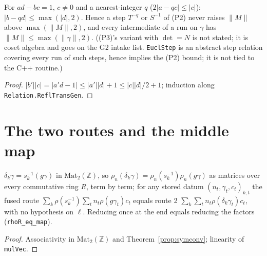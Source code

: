 \begin{lemma}\label{lem:bounds-4}
  \leanok
  For $ad-bc=1$, $c\ne0$ and a nearest-integer $q$ ($2|a-qc|\le|c|$): $|b-qd|\le\max(|d|,2)$. Hence a step $T^{-q}$ or
  $S^{-1}$ of (P2) never raises $\|M\|$ above $\max(\|M\|,2)$, and every intermediate of a run on $\gamma$ has
  $\|M\|\le\max(\|\gamma\|,2)$. ((P3)'s variant with $\det=N$ is not stated; it is coset algebra and goes on the G2 intake list. \texttt{EuclStep} is an abstract step relation covering every run of such steps, hence implies the (P2) bound; it is not tied to the C++ routine.)
\end{lemma}
\begin{proof}
  \leanok
  $|b'||c|=|a'd-1|\le|a'||d|+1\le|c||d|/2+1$; induction along \texttt{Relation.ReflTransGen}.
\end{proof}

\section{The two routes and the middle map}

\begin{proposition}\label{prop:tworoutes}
  \leanok
  $\delta_k\gamma=s_k^{-1}(g\gamma)$ in $\mathrm{Mat}_2(\mathbb Z)$, so $\rho_n(\delta_k\gamma)=\rho_n(s_k^{-1})\rho_n(g\gamma)$ as matrices
  over every commutative ring $R$, term by term; for any stored datum $(n_t,\gamma_t,c_t)_{k,t}$ the fused route
  $\sum_k\rho(s_k^{-1})\sum_tn_t\rho(g\gamma_t)c_t$ equals route 2 $\sum_k\sum_tn_t\rho(\delta_k\gamma_t)c_t$, with no hypothesis on
  $\ell$. Reducing once at the end equals reducing the factors (\texttt{rhoR\_eq\_map}).
\end{proposition}
\begin{proof}
  \leanok
  Associativity in $\mathrm{Mat}_2(\mathbb Z)$ and Theorem~\ref{prop:symconv}; linearity of \texttt{mulVec}.
\end{proof}

